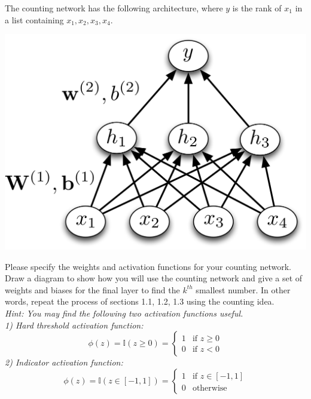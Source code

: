 \documentclass[11pt]{article}
\newcommand{\indicator}{\mathbb{I}}  %
\begin{document}
    \noindent The counting network has the following architecture, where $y$ is the rank of $x_1$ in a list containing $x_1, x_2, x_3, x_4$. 
        \begin{center}
            \includegraphics[width=0.3 \textwidth]{figures/architecture.png} 
        \end{center} 
        
    \noindent Please specify the weights and activation functions for your counting network. Draw a diagram to show how you will use the counting network and give a set of weights and biases for the final layer to find the $k^{th}$ smallest number. In other words, repeat the process of sections 1.1, 1.2, 1.3 using the counting idea. \\
    
    \noindent \emph{Hint: You may find the following two activation functions useful.} \\
    \noindent \emph{1) Hard threshold activation function:}
        \[ \phi(z) = \indicator(z \geq 0) = \left\{ \begin{array}{ll} 1 & \textrm{if } z \geq 0 \\ 0 & \textrm{if } z < 0 \end{array} \right. \]
    \emph{2) Indicator activation function:}
        \[ \phi(z) = \indicator(z \in [-1, 1]) = \left\{ \begin{array}{ll} 1 & \textrm{if } z \in [-1, 1] \\ 0 & \textrm{otherwise} \end{array} \right. \]
        
  
\bigskip
    
\end{document}
